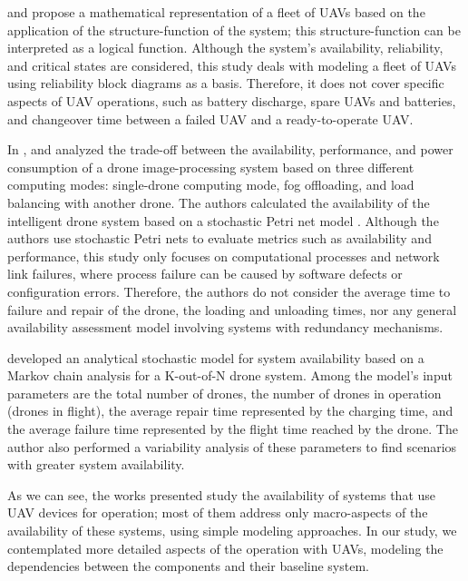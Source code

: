 \documentclass[conference]{IEEEtran}
\begin{document}
\citet{Zaitseva2020} and \citet{rusnak2019reliability} propose a mathematical representation of a fleet of UAVs based on the application of the structure-function of the system; this structure-function can be interpreted as a logical function. Although the system's availability, reliability, and critical states are considered, this study deals with modeling a fleet of UAVs using reliability block diagrams as a basis. Therefore, it does not cover specific aspects of UAV operations, such as battery discharge, spare UAVs and batteries, and changeover time between a failed UAV and a ready-to-operate UAV.

In \citet{Machida2021}, and \citet{watanabe2022availability} analyzed the trade-off between the availability, performance, and power consumption of a drone image-processing system based on three different computing modes: single-drone computing mode, fog offloading, and load balancing with another drone. The authors calculated the availability of the intelligent drone system based on a stochastic Petri net model \cite{molloy1982integration,marsan1998modelling,german2000performance,gspn98,maciel_2023_vol1}. Although the authors use stochastic Petri nets to evaluate metrics such as availability and performance, this study only focuses on computational processes and network link failures, where process failure can be caused by software defects or configuration errors. Therefore, the authors do not consider the average time to failure and repair of the drone, the loading and unloading times, nor any general availability assessment model involving systems with redundancy mechanisms.

\citet{Maccarthy2019} developed an analytical stochastic model for system availability based on a Markov chain analysis for a K-out-of-N drone system. Among the model's input parameters are the total number of drones, the number of drones in operation (drones in flight), the average repair time represented by the charging time, and the average failure time represented by the flight time reached by the drone. The author also performed a variability analysis of these parameters to find scenarios with greater system availability.

As we can see, the works presented study the availability of systems that use UAV devices for operation; most of them address only macro-aspects of the availability of these systems, using simple modeling approaches. In our study, we contemplated more detailed aspects of the operation with UAVs, modeling the dependencies between the components and their baseline system.
\end{document}
